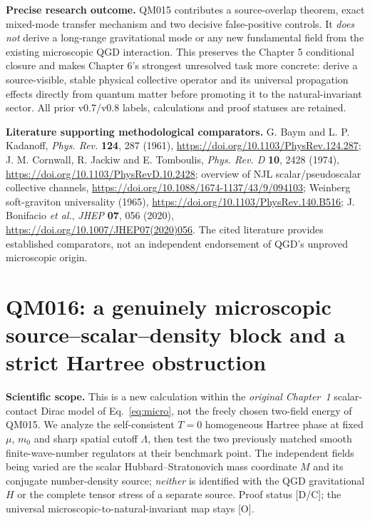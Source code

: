 \documentclass[11pt,a4paper]{article}
\begin{document}
\textbf{Precise research outcome.} QM015 contributes a source-overlap theorem, exact mixed-mode transfer mechanism and two decisive false-positive controls. It \emph{does not} derive a long-range gravitational mode or any new fundamental field from the existing microscopic QGD interaction. This preserves the Chapter 5 conditional closure and makes Chapter 6's strongest unresolved task more concrete: derive a source-visible, stable physical collective operator and its universal propagation effects directly from quantum matter before promoting it to the natural-invariant sector. All prior v0.7/v0.8 labels, calculations and proof statuses are retained.

\textbf{Literature supporting methodological comparators.} G. Baym and L. P. Kadanoff, \emph{Phys. Rev.} \textbf{124}, 287 (1961), \url{https://doi.org/10.1103/PhysRev.124.287}; J. M. Cornwall, R. Jackiw and E. Tomboulis, \emph{Phys. Rev. D} \textbf{10}, 2428 (1974), \url{https://doi.org/10.1103/PhysRevD.10.2428}; overview of NJL scalar/pseudoscalar collective channels, \url{https://doi.org/10.1088/1674-1137/43/9/094103}; Weinberg soft-graviton universality (1965), \url{https://doi.org/10.1103/PhysRev.140.B516}; J. Bonifacio \emph{et al.}, \emph{JHEP} \textbf{07}, 056 (2020), \url{https://doi.org/10.1007/JHEP07(2020)056}. The cited literature provides established comparators, not an independent endorsement of QGD's unproved microscopic origin.

\section{QM016: a genuinely microscopic source--scalar--density block and a strict Hartree obstruction}\label{sec:v10-qm016}
\textbf{Scientific scope.} This is a new calculation within the \emph{original Chapter~1} scalar-contact Dirac model of Eq.~\eqref{eq:micro}, not the freely chosen two-field energy of QM015. We analyze the self-consistent $T=0$ homogeneous Hartree phase at fixed $\mu$, $m_0$ and sharp spatial cutoff $\Lambda$, then test the two previously matched smooth finite-wave-number regulators at their benchmark point. The independent fields being varied are the scalar Hubbard--Stratonovich mass coordinate $M$ and its conjugate number-density source; \emph{neither} is identified with the QGD gravitational $H$ or the complete tensor stress of a separate source. Proof status [D/C]; the universal microscopic-to-natural-invariant map stays [O].
\end{document}
